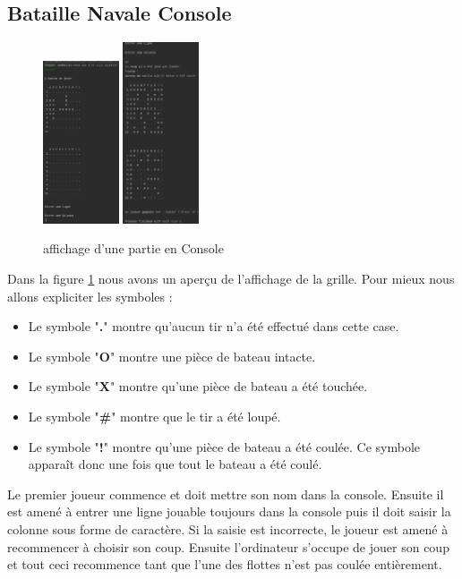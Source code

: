 \documentclass[12pt]{article}
\begin{document}
\subsection{Bataille Navale Console}
\begin{figure}[h]
\center
\includegraphics[width=0.2\textwidth]{./images/debutPartieConsole.png}
\includegraphics[width=0.2\textwidth]{./images/finPartieConsole.png}
\caption{affichage d'une partie en Console\label{img:figure1}}

\end{figure}
Dans la figure \ref{img:figure1} nous avons un aperçu de l'affichage de la grille. Pour mieux nous allons expliciter les symboles :
\begin{itemize}
    \item Le symbole "\textbf{.}" montre qu'aucun tir n'a été effectué dans cette case.
    \item Le symbole "\textbf{O}" montre une pièce de bateau intacte.
    \item Le symbole "\textbf{X}" montre qu'une pièce de bateau a été touchée.
    \item Le symbole "\textbf{\#}" montre que le tir a été loupé.
    \item Le symbole "\textbf{!}" montre qu'une pièce de bateau a été coulée. Ce symbole apparaît donc une fois que tout le bateau a été coulé.
    
\end{itemize}
Le premier joueur commence et doit mettre son nom dans la console. Ensuite il est amené à entrer une ligne jouable toujours dans la console puis il doit saisir la colonne sous forme de caractère. Si la saisie est incorrecte, le joueur est amené à recommencer à choisir son coup. Ensuite l'ordinateur s'occupe de jouer son coup et tout ceci recommence tant que l'une des flottes n'est pas coulée entièrement.
\end{document}
